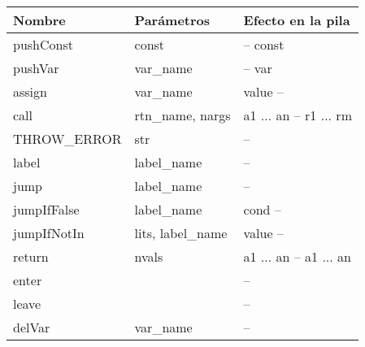 \documentclass{article}
\begin{document}
\begin{tabular}{l|l|l}
\textbf{Nombre} & \textbf{Par\'ametros} & \textbf{Efecto en la pila}\\
\hline
pushConst   & const                       &           -- const\\
pushVar     & var_name                    &           -- var\\
assign      & var_name                    & value     --\\
call        & rtn_name, nargs             & a1 ... an -- r1 ... rm\\
THROW_ERROR        & str                         &           --\\
label       & label_name                  &           --\\
jump        & label_name                  &           --\\
jumpIfFalse & label_name                  &      cond --\\
jumpIfNotIn & lits, label_name            &     value --\\
return      & nvals                       & a1 ... an -- a1 ... an\\
enter                                   & & -- \\
leave                                   & & -- \\
delVar      & var_name                    & -- \\
\hline
\end{tabular}
\end{document}
